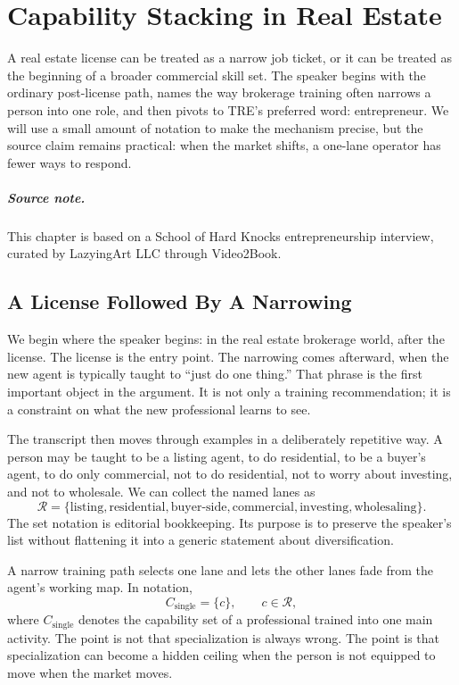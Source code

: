 \chapter{Capability Stacking in Real Estate}

A real estate license can be treated as a narrow job ticket, or it can be treated as the beginning of a broader commercial skill set. The speaker begins with the ordinary post-license path, names the way brokerage training often narrows a person into one role, and then pivots to TRE's preferred word: entrepreneur. We will use a small amount of notation to make the mechanism precise, but the source claim remains practical: when the market shifts, a one-lane operator has fewer ways to respond.

\paragraph{Source note.} This chapter is based on a School of Hard Knocks entrepreneurship interview, curated by LazyingArt LLC through Video2Book.

\section{A License Followed By A Narrowing}

We begin where the speaker begins: in the real estate brokerage world, after the license. The license is the entry point. The narrowing comes afterward, when the new agent is typically taught to ``just do one thing.'' That phrase is the first important object in the argument. It is not only a training recommendation; it is a constraint on what the new professional learns to see.

The transcript then moves through examples in a deliberately repetitive way. A person may be taught to be a listing agent, to do residential, to be a buyer's agent, to do only commercial, not to do residential, not to worry about investing, and not to wholesale. We can collect the named lanes as
\begin{equation}
\mathcal{R}
=
\{
\text{listing},
\text{residential},
\text{buyer-side},
\text{commercial},
\text{investing},
\text{wholesaling}
\}.
\end{equation}
The set notation is editorial bookkeeping. Its purpose is to preserve the speaker's list without flattening it into a generic statement about diversification.

A narrow training path selects one lane and lets the other lanes fade from the agent's working map. In notation,
\begin{equation}
C_{\text{single}}=\{c\},
\qquad
c\in \mathcal{R},
\end{equation}
where \(C_{\text{single}}\) denotes the capability set of a professional trained into one main activity. The point is not that specialization is always wrong. The point is that specialization can become a hidden ceiling when the person is not equipped to move when the market moves.


